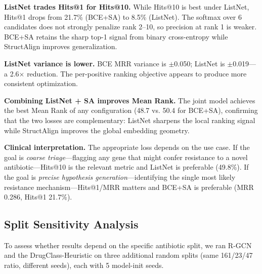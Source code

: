\documentclass[conference]{IEEEtran}
\begin{document}
\textbf{ListNet trades Hits@1 for Hits@10.} While Hits@10 is best under ListNet, Hits@1 drops from 21.7\% (BCE+SA) to 8.5\% (ListNet). The softmax over 6 candidates does not strongly penalize rank 2--10, so precision at rank 1 is weaker. BCE+SA retains the sharp top-1 signal from binary cross-entropy while StructAlign improves generalization.

\textbf{ListNet variance is lower.} BCE MRR variance is $\pm$0.050; ListNet is $\pm$0.019---a 2.6$\times$ reduction. The per-positive ranking objective appears to produce more consistent optimization.

\textbf{Combining ListNet + SA improves Mean Rank.} The joint model achieves the best Mean Rank of any configuration (48.7 vs. 50.4 for BCE+SA), confirming that the two losses are complementary: ListNet sharpens the local ranking signal while StructAlign improves the global embedding geometry.

\textbf{Clinical interpretation.} The appropriate loss depends on the use case. If the goal is \textit{coarse triage}---flagging any gene that might confer resistance to a novel antibiotic---Hits@10 is the relevant metric and ListNet is preferable (49.8\%). If the goal is \textit{precise hypothesis generation}---identifying the single most likely resistance mechanism---Hits@1/MRR matters and BCE+SA is preferable (MRR 0.286, Hits@1 21.7\%).

\subsection{Split Sensitivity Analysis}

To assess whether results depend on the specific antibiotic split, we ran R-GCN and the DrugClass-Heuristic on three additional random splits (same 161/23/47 ratio, different seeds), each with 5 model-init seeds.
\end{document}
